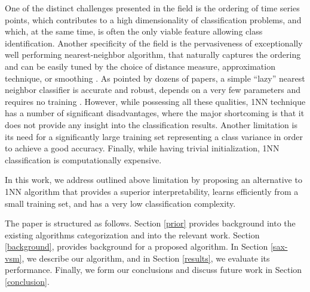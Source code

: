 \documentclass[conference]{IEEEtran}
\begin{document}
One of the distinct challenges presented in the field is the ordering of time series 
points, which contributes to a high dimensionality of classification problems,
and which, at the same time, is often the only viable feature allowing class identification. 
Another specificity of the field is the pervasiveness of exceptionally well performing 
nearest-neighbor algorithm, that naturally captures the ordering and can be 
easily tuned by the choice of distance measure, approximation technique, 
or smoothing \cite{comparison}. 
As pointed by dozens of papers, a simple ``lazy'' nearest neighbor classifier is 
accurate and robust, depends on a very few parameters and requires no 
training \cite{review, benchmark, comparison, classifiers}. 
However, while possessing all these qualities, 1NN technique has a number of 
significant disadvantages, where the major shortcoming is that it does not provide any 
insight into the classification results. 
Another limitation is its need for a significantly large training set representing a 
class variance in order to achieve a good accuracy. 
Finally, while having trivial initialization, 1NN classification is computationally expensive.

In this work, we address outlined above limitation by proposing an alternative 
to 1NN algorithm that provides a superior interpretability, learns efficiently from a
small training set, and has a very low classification complexity.

The paper is structured as follows. 
Section \ref{prior} provides background into the existing algorithms categorization and into 
the relevant work. Section \ref{background}, provides background for a proposed algorithm. 
In Section \ref{sax-vsm}, we describe our algorithm, and in Section \ref{results}, we
evaluate its performance. Finally, we form our conclusions and discuss future work 
in Section \ref{conclusion}.
\end{document}
